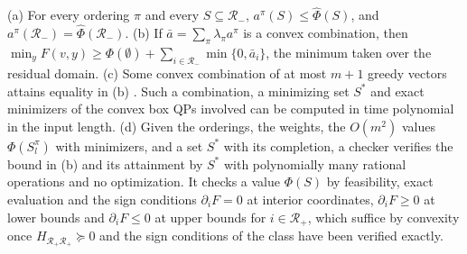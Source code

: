\begin{proposition}\label{prop:cr-greedy}
(a) For every ordering $\pi$ and every $S\subseteq\mathcal R_-$,
$a^\pi(S)\le\hat\Phi(S)$, and $a^\pi(\mathcal R_-)=\hat\Phi(\mathcal R_-)$.
(b) If $\bar a=\sum_\pi\lambda_\pi a^\pi$ is a convex combination, then
$\min_yF(v,y)\ge\Phi(\emptyset)+\sum_{i\in\mathcal R_-}\min\{0,\bar a_i\}$,
the minimum taken over the residual domain.
(c) Some convex combination of at most $m+1$ greedy vectors attains
equality in (b) \cite{Edmonds1970}. Such a combination, a minimizing set
$S^*$ and exact minimizers of the convex box QPs involved can be computed in
time polynomial in the input length.
(d) Given the orderings, the weights, the $O(m^2)$ values $\Phi(S^\pi_l)$
with minimizers, and a set $S^*$ with its completion, a checker verifies the
bound in (b) and its attainment by $S^*$ with polynomially many rational
operations and no optimization. It checks a value $\Phi(S)$ by feasibility,
exact evaluation and the sign conditions $\partial_iF=0$ at interior
coordinates, $\partial_iF\ge0$ at lower bounds and $\partial_iF\le0$ at upper
bounds for $i\in\mathcal R_+$, which suffice by convexity once
$H_{\mathcal R_+\mathcal R_+}\succeq0$ and the sign conditions of the class
have been verified exactly.
\end{proposition}

